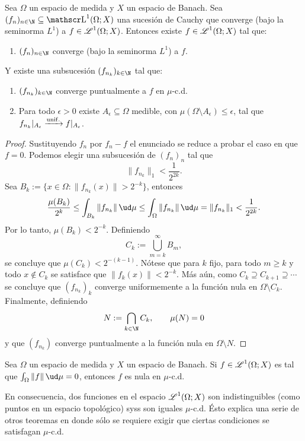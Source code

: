 \begin{thm}\label{thm:L1_convergence_pointwise}
	Sea $\Omega$ un espacio de medida y $X$ un espacio de Banach.
	Sea $(f_n)_{n\in\N} \subseteq \LL^1(\Omega; X)$ una sucesión de Cauchy que converge (bajo la seminorma $L^1$) a $f \in \operatorname{\mathscr{L}}^1(\Omega; X)$.
	Entonces existe $f \in \operatorname{\mathscr{L}}^1(\Omega; X)$ tal que:
	\begin{enumerate}
		\item $(f_n)_{n\in\N}$ converge (bajo la seminorma $L^1$) a $f$.
	\end{enumerate}
	Y existe una subsucesión $(f_{n_k})_{k\in\N}$ tal que:
	\begin{enumerate}[resume]
		\item $(f_{n_k})_{k\in\N}$ converge puntualmente a $f$ en $\mu$-c.d.
		\item Para todo $\epsilon > 0$ existe $A_\epsilon \subseteq \Omega$ medible, con $\mu(\Omega \setminus A_\epsilon) \le \epsilon$,
			tal que $f_{n_k}|_{A_\epsilon} \xrightarrow{\rm unif.} f|_{A_\epsilon}$.
	\end{enumerate}
\end{thm}
\begin{proof}
	Sustituyendo $f_n$ por $f_n - f$ el enunciado se reduce a probar el caso en que $f = 0$.
	Podemos elegir una subsucesión de $(f_n)_n$ tal que
	$$ \| f_{n_k} \|_1 < \frac{1}{2^{2k}}. $$
	Sea $B_k := \{ x\in\Omega : \|f_{n_k}(x)\| > 2^{-k} \}$, entonces
	$$ \frac{\mu(B_k)}{2^k} \le \int_{B_k} \|f_{n_k}\| \, \ud\mu \le \int_\Omega \|f_{n_k}\| \, \ud\mu = \|f_{n_k}\|_1 < \frac{1}{2^{2k}}. $$
	Por lo tanto, $\mu(B_k) < 2^{-k}$.
	Definiendo
	$$ C_k := \bigcup_{m=k}^\infty B_m, $$
	se concluye que $\mu(C_k) < 2^{-(k-1)}$.
	Nótese que para $k$ fijo, para todo $m \ge k$ y todo $x \notin C_k$ se satisface que $\|f_k(x)\| < 2^{-k}$.
	Más aún, como $C_k \supseteq C_{k+1} \supseteq \cdots$ se concluye que $(f_{n_k})_k$ converge uniformemente a la función nula en $\Omega \setminus C_k$.
	Finalmente, definiendo
	$$ N := \bigcap_{k\in\N} C_k, \qquad \mu(N) = 0 $$
	y que $(f_{n_k})$ converge puntualmente a la función nula en $\Omega \setminus N$.
\end{proof}

\begin{cor}
	Sea $\Omega$ un espacio de medida y $X$ un espacio de Banach.
	Si $f \in \operatorname{\mathscr{L}}^1(\Omega; X)$ es tal que $ \int_{\Omega} \|f\| \, \ud\mu = 0 $, entonces $f$ es nula en $\mu$-c.d.
\end{cor}
En consecuencia, dos funciones en el espacio $\operatorname{\mathscr{L}}^1(\Omega; X)$ son indistinguibles (como puntos en un espacio topológico) syss son iguales $\mu$-c.d.
Ésto explica una serie de otros teoremas en donde sólo se requiere exigir que ciertas condiciones se satisfagan $\mu$-c.d.

